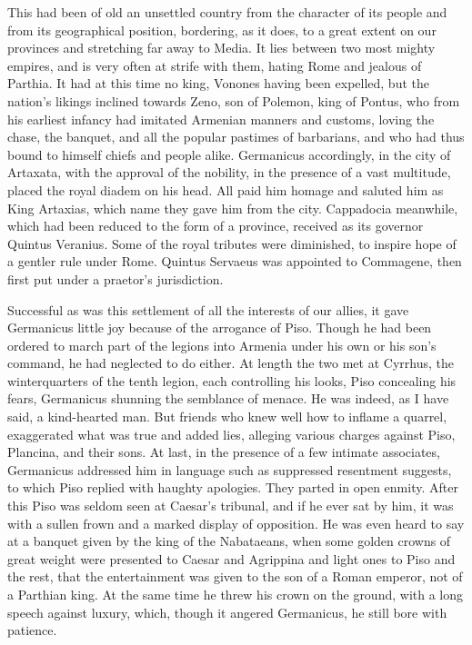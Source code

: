 This had been of old an unsettled country from the character of its people and from its geographical position, bordering, as it does, to a great extent on our provinces and stretching far away to Media. It lies between two most mighty empires, and is very often at strife with them, hating Rome and jealous of Parthia. It had at this time no king, Vonones having been expelled, but the nation's likings inclined towards Zeno, son of Polemon, king of Pontus, who from his earliest infancy had imitated Armenian manners and customs, loving the chase, the banquet, and all the popular pastimes of barbarians, and who had thus bound to himself chiefs and people alike. Germanicus accordingly, in the city of Artaxata, with the approval of the nobility, in the presence of a vast multitude, placed the royal diadem on his head. All paid him homage and saluted him as King Artaxias, which name they gave him from the city. Cappadocia meanwhile, which had been reduced to the form of a province, received as its governor Quintus Veranius. Some of the royal tributes were diminished, to inspire hope of a gentler rule under Rome. Quintus Servaeus was appointed to Commagene, then first put under a praetor's jurisdiction.


Successful as was this settlement of all the interests of our allies, it gave Germanicus little joy because of the arrogance of Piso. Though he had been ordered to march part of the legions into Armenia under his own or his son's command, he had neglected to do either. At length the two met at Cyrrhus, the winterquarters of the tenth legion, each controlling his looks, Piso concealing his fears, Germanicus shunning the semblance of menace. He was indeed, as I have said, a kind-hearted man. But friends who knew well how to inflame a quarrel, exaggerated what was true and added lies, alleging various charges against Piso, Plancina, and their sons. At last, in the presence of a few intimate associates, Germanicus addressed him in language such as suppressed resentment suggests, to which Piso replied with haughty apologies. They parted in open enmity. After this Piso was seldom seen at Caesar's tribunal, and if he ever sat by him, it was with a sullen frown and a marked display of opposition. He was even heard to say at a banquet given by the king of the Nabataeans, when some golden crowns of great weight were presented to Caesar and Agrippina and light ones to Piso and the rest, that the entertainment was given to the son of a Roman emperor, not of a Parthian king. At the same time he threw his crown on the ground, with a long speech against luxury, which, though it angered Germanicus, he still bore with patience.

